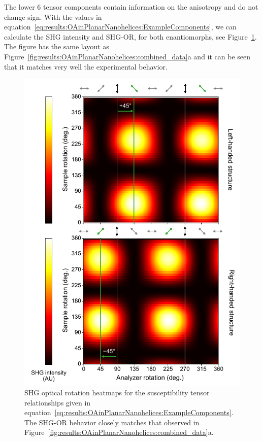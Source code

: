 The lower 6 tensor components contain information on the anisotropy and do not change sign. 
With the values in equation~\ref{eq:results:OAinPlanarNanohelices:ExampleComponents}, we can calculate the SHG intensity and SHG-OR, for both enantiomorphs, see Figure~\ref{fig:results:OAinPlanarNanohelices:sim_data}. 
The figure has the same layout as Figure~\ref{fig:results:OAinPlanarNanohelices:combined_data}a and it can be seen that it matches very well the experimental behavior. 
\begin{figure}[htb!]	
    \centering	
    \includegraphics[scale=0.8]{./figures/results/OAinPlanarNanohelices/sim_data.pdf}

    \caption{\label{fig:results:OAinPlanarNanohelices:sim_data}
    SHG optical rotation heatmaps for the susceptibility tensor relationships given in equation~\ref{eq:results:OAinPlanarNanohelices:ExampleComponents}. The SHG-OR behavior closely matches that observed in Figure~\ref{fig:results:OAinPlanarNanohelices:combined_data}a.}
\end{figure}

